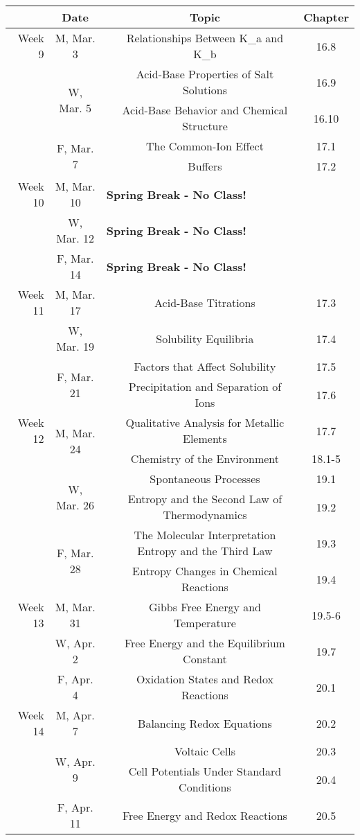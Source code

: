 \documentclass[12pt, letterpaper]{article}
\begin{document}
\begin{tabular}{rcccc}
& Date && Topic & Chapter\\
\midrule
Week 9 & M, Mar. 3&& Relationships Between K_a and K_b & 16.8\\
& \multirow{2}{*}{W, Mar. 5}& & Acid-Base Properties of Salt Solutions & 16.9\\
& & & Acid-Base Behavior and Chemical Structure & 16.10\\
& \multirow{2}{*}{F, Mar. 7}& & The Common-Ion Effect & 17.1\\
& & & Buffers & 17.2\\
\midrule
Week 10 & M, Mar. 10& \multicolumn{3}{l}{\textbf{Spring Break - No Class!}}\\
& W, Mar. 12& \multicolumn{3}{l}{\textbf{Spring Break - No Class!}}\\
& F, Mar. 14& \multicolumn{3}{l}{\textbf{Spring Break - No Class!}}\\
\midrule
Week 11 & M, Mar. 17&& Acid-Base Titrations & 17.3\\
& W, Mar. 19&& Solubility Equilibria & 17.4\\
& \multirow{2}{*}{F, Mar. 21}& & Factors that Affect Solubility & 17.5\\
& & & Precipitation and Separation of Ions & 17.6\\
\midrule
Week 12 & \multirow{2}{*}{M, Mar. 24}& & Qualitative Analysis for Metallic Elements & 17.7\\
& & & Chemistry of the Environment & 18.1-5\\
& \multirow{2}{*}{W, Mar. 26}& & Spontaneous Processes & 19.1\\
& & & Entropy and the Second Law of Thermodynamics & 19.2\\
& \multirow{2}{*}{F, Mar. 28}& & The Molecular Interpretation Entropy and the Third Law & 19.3\\
& & & Entropy Changes in Chemical Reactions & 19.4\\
\midrule
Week 13 & M, Mar. 31&& Gibbs Free Energy and Temperature & 19.5-6\\
& W, Apr. 2&& Free Energy and the Equilibrium Constant & 19.7\\
& F, Apr. 4&& Oxidation States and Redox Reactions & 20.1\\
\midrule
Week 14 & M, Apr. 7&& Balancing Redox Equations & 20.2\\
& \multirow{2}{*}{W, Apr. 9}& & Voltaic Cells & 20.3\\
& & & Cell Potentials Under Standard Conditions & 20.4\\
& F, Apr. 11&& Free Energy and Redox Reactions & 20.5\\
\end{tabular}
\end{document}
